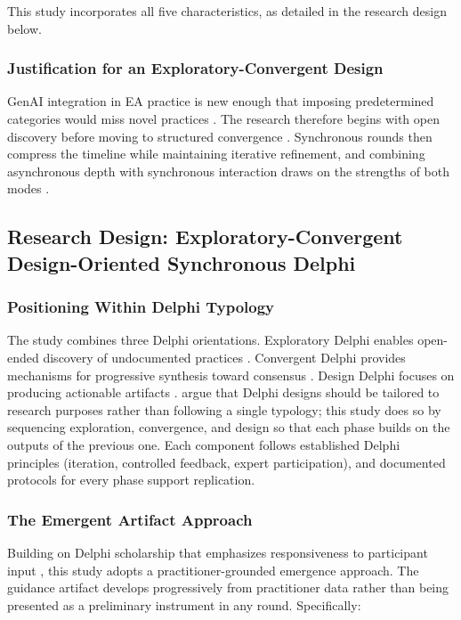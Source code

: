 This study incorporates all five characteristics, as detailed in the research
design below.

\subsubsection{Justification for an Exploratory-Convergent Design}

GenAI integration in EA practice is new enough that imposing predetermined
categories would miss novel practices
\parencite{okoli_delphi_2004}. The research therefore begins with open
discovery before moving to structured convergence
\parencite{schmidt_managing_1997}. Synchronous rounds then compress the
timeline while maintaining iterative refinement, and combining asynchronous
depth with synchronous interaction draws on the strengths of both modes
\parencite{gordon_rt_2006}.

\subsection{Research Design: Exploratory-Convergent Design-Oriented Synchronous Delphi}

\subsubsection{Positioning Within Delphi Typology}

The study combines three Delphi orientations. Exploratory Delphi enables
open-ended discovery of undocumented practices
\parencite{okoli_delphi_2004}. Convergent Delphi provides mechanisms for
progressive synthesis toward consensus \parencite{linstone_delphi_1975}.
Design Delphi focuses on producing actionable artifacts
\parencite{skulmoski_delphi_2007}. \textcite{day_generic_2005} argue that
Delphi designs should be tailored to research purposes rather than following a
single typology; this study does so by sequencing exploration, convergence, and
design so that each phase builds on the outputs of the previous one. Each
component follows established Delphi principles (iteration, controlled
feedback, expert participation), and documented protocols for every phase
support replication.

\subsubsection{The Emergent Artifact Approach}\label{subsec:design-choices}

Building on Delphi scholarship that emphasizes responsiveness to participant
input \parencite{linstone_delphi_1975}, this study adopts a practitioner-grounded
emergence approach. The guidance artifact develops progressively from
practitioner data rather than being presented as a preliminary instrument in any
round.
Specifically:

